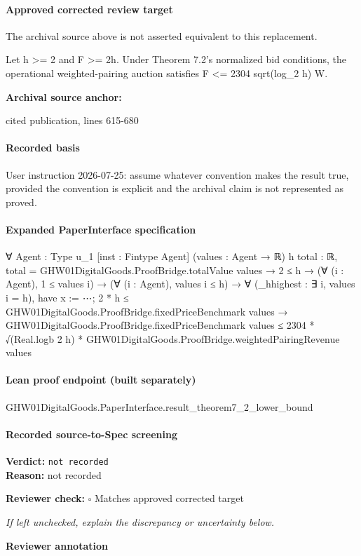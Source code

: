 \documentclass[10pt]{article}
\newcommand{\reviewerbox}{%
  \par\noindent\fbox{\parbox{0.96\linewidth}{\rule{0pt}{0.38in}}}\par
}
\newcommand{\reviewmatch}[1]{%
  \par\noindent\textbf{Reviewer check:} $\square$\; #1\par
  \noindent\emph{If left unchecked, explain the discrepancy or uncertainty below.}\par
}
\begin{document}
\paragraph{Approved corrected review target}
The archival source above is not asserted equivalent to this replacement.
\begin{ReviewVerbatim}
Let h >= 2 and F >= 2h. Under Theorem 7.2's normalized bid conditions, the operational weighted-pairing auction satisfies F <= 2304 sqrt(log_2 h) W.
\end{ReviewVerbatim}

\textbf{Archival source anchor:} {\footnotesize\raggedright cited publication, lines 615-\allowbreak{}680\par}
\paragraph{Recorded basis}
User instruction 2026-\allowbreak{}07-\allowbreak{}25:\allowbreak{} assume whatever convention makes the result true, provided the convention is explicit and the archival claim is not represented as proved.\allowbreak{}
\paragraph{Expanded PaperInterface specification}
\begin{ReviewVerbatim}
∀ {Agent : Type u_1} [inst : Fintype Agent] (values : Agent → ℝ) {h total : ℝ},
  total = GHW01DigitalGoods.ProofBridge.totalValue values →
    2 ≤ h →
      (∀ (i : Agent), 1 ≤ values i) →
        (∀ (i : Agent), values i ≤ h) →
          ∀ (_hhighest : ∃ i, values i = h),
            have x := ⋯;
            2 * h ≤ GHW01DigitalGoods.ProofBridge.fixedPriceBenchmark values →
              GHW01DigitalGoods.ProofBridge.fixedPriceBenchmark values ≤
                2304 * √(Real.logb 2 h) * GHW01DigitalGoods.ProofBridge.weightedPairingRevenue values
\end{ReviewVerbatim}

\paragraph{Lean proof endpoint (built separately)}\begin{ReviewVerbatim}
GHW01DigitalGoods.PaperInterface.result_theorem7_2_lower_bound
\end{ReviewVerbatim}

\paragraph{Recorded source-to-Spec screening}
\textbf{Verdict:} \texttt{not recorded}
\\
\textbf{Reason:} not recorded
\reviewmatch{Matches approved corrected target}
\noindent\textbf{Reviewer annotation}\par
\reviewerbox
\clearpage
\hypertarget{source-claim-9c375a1b7af827ba}{}
\end{document}
